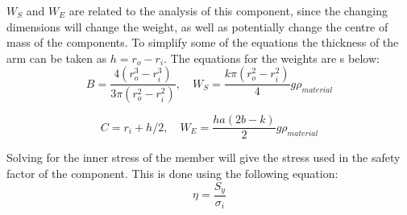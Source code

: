 \documentclass[../main.tex]{subfiles}
\begin{document}
$W_S$ and $W_E$ are related to the analysis of this component, since the changing dimensions will change the weight, as well as potentially change the centre of mass of the components. To simplify some of the equations the thickness of the arm can be taken as $h = r_o - r_i$. The equations for the weights are s below:
\begin{equation} \label{eqn:CurveSupportWeight}
B= \frac{4(r_o^3-r_i^3)}{3\pi (r_o^2-r_i^2)}, \quad 
W_{S} = \frac{k\pi(r_o^2-r_i^2)}{4}g\rho_{material}
\end{equation}

\begin{equation} \label{eqn:EnvelopeSupportWeight}
C = r_i + h/2, \quad 
W_{E} = \frac{ha(2b-k)}{2}g\rho_{material}
\end{equation}

Solving for the inner stress of the member will give the stress used in the safety factor of the component. This is done using the following equation:
\begin{equation} \label{eqn:CurveSafetyFactor}
\eta = \frac{S_y}{\sigma_i}
\end{equation}
\end{document}
